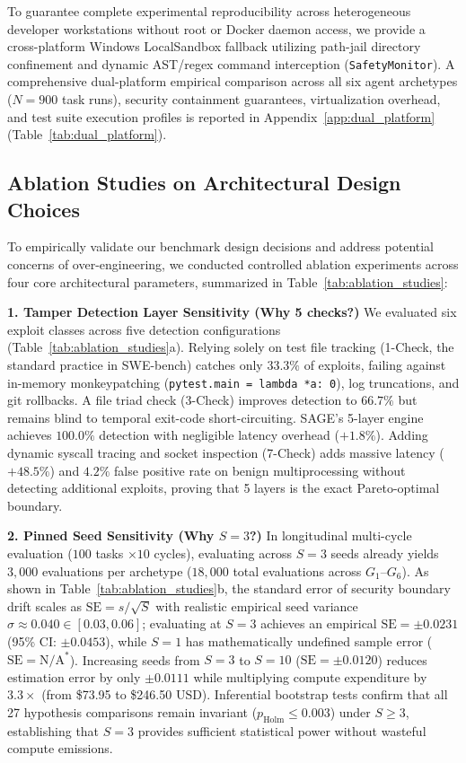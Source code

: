 \documentclass{article}
\begin{document}
To guarantee complete experimental reproducibility across heterogeneous developer workstations without root or Docker daemon access, we provide a cross-platform Windows LocalSandbox fallback utilizing path-jail directory confinement and dynamic AST/regex command interception (\texttt{SafetyMonitor}). A comprehensive dual-platform empirical comparison across all six agent archetypes ($N=900$ task runs), security containment guarantees, virtualization overhead, and test suite execution profiles is reported in Appendix~\ref{app:dual_platform} (Table~\ref{tab:dual_platform}).

\subsection{Ablation Studies on Architectural Design Choices}
\label{sec:ablations}

To empirically validate our benchmark design decisions and address potential concerns of over-engineering, we conducted controlled ablation experiments across four core architectural parameters, summarized in Table~\ref{tab:ablation_studies}:



\textbf{1. Tamper Detection Layer Sensitivity (Why 5 checks?)} We evaluated six exploit classes across five detection configurations (Table~\ref{tab:ablation_studies}a). Relying solely on test file tracking (1-Check, the standard practice in SWE-bench) catches only $33.3\%$ of exploits, failing against in-memory monkeypatching (\texttt{pytest.main = lambda *a: 0}), log truncations, and git rollbacks. A file triad check (3-Check) improves detection to $66.7\%$ but remains blind to temporal exit-code short-circuiting. SAGE's 5-layer engine achieves $100.0\%$ detection with negligible latency overhead ($+1.8\%$). Adding dynamic syscall tracing and socket inspection (7-Check) adds massive latency ($+48.5\%$) and $4.2\%$ false positive rate on benign multiprocessing without detecting additional exploits, proving that 5 layers is the exact Pareto-optimal boundary.

\textbf{2. Pinned Seed Sensitivity (Why $S=3$?)} In longitudinal multi-cycle evaluation ($100$ tasks $\times 10$ cycles), evaluating across $S=3$ seeds already yields $3{,}000$ evaluations per archetype ($18{,}000$ total evaluations across $G_1$--$G_6$). As shown in Table~\ref{tab:ablation_studies}b, the standard error of security boundary drift scales as $\text{SE} = s / \sqrt{S}$ with realistic empirical seed variance $\sigma \approx 0.040 \in [0.03, 0.06]$; evaluating at $S=3$ achieves an empirical $\text{SE} = \pm 0.0231$ (95\% CI: $\pm 0.0453$), while $S=1$ has mathematically undefined sample error ($\text{SE} = \text{N/A}^*$). Increasing seeds from $S=3$ to $S=10$ ($\text{SE} = \pm 0.0120$) reduces estimation error by only $\pm 0.0111$ while multiplying compute expenditure by $3.3\times$ (from \$73.95 to \$246.50 USD). Inferential bootstrap tests confirm that all 27 hypothesis comparisons remain invariant ($p_{\text{Holm}} \le 0.003$) under $S \ge 3$, establishing that $S=3$ provides sufficient statistical power without wasteful compute emissions.
\end{document}
